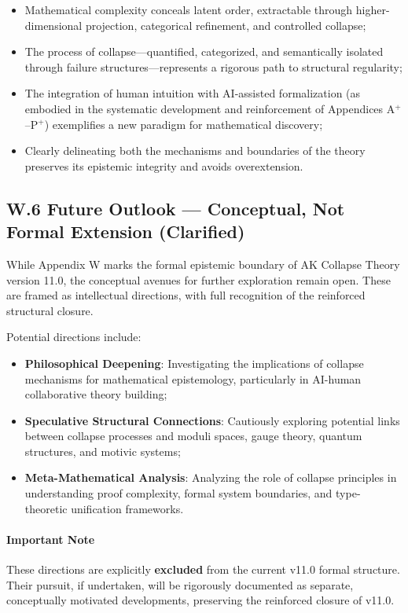 \documentclass[11pt]{article}
\begin{document}
\begin{itemize}
    \item Mathematical complexity conceals latent order, extractable through higher-dimensional projection, categorical refinement, and controlled collapse;
    \item The process of collapse—quantified, categorized, and semantically isolated through failure structures—represents a rigorous path to structural regularity;
    \item The integration of human intuition with AI-assisted formalization (as embodied in the systematic development and reinforcement of Appendices A$^{+}$–P$^{+}$) exemplifies a new paradigm for mathematical discovery;
    \item Clearly delineating both the mechanisms and boundaries of the theory preserves its epistemic integrity and avoids overextension.
\end{itemize}

\subsection*{W.6 Future Outlook — Conceptual, Not Formal Extension (Clarified)}

While Appendix W marks the formal epistemic boundary of AK Collapse Theory version 11.0, the conceptual avenues for further exploration remain open. These are framed as intellectual directions, with full recognition of the reinforced structural closure.

Potential directions include:

\begin{itemize}
    \item \textbf{Philosophical Deepening}: Investigating the implications of collapse mechanisms for mathematical epistemology, particularly in AI-human collaborative theory building;
    \item \textbf{Speculative Structural Connections}: Cautiously exploring potential links between collapse processes and moduli spaces, gauge theory, quantum structures, and motivic systems;
    \item \textbf{Meta-Mathematical Analysis}: Analyzing the role of collapse principles in understanding proof complexity, formal system boundaries, and type-theoretic unification frameworks.
\end{itemize}

\paragraph{Important Note}  
These directions are explicitly \textbf{excluded} from the current v11.0 formal structure. Their pursuit, if undertaken, will be rigorously documented as separate, conceptually motivated developments, preserving the reinforced closure of v11.0.
\end{document}
